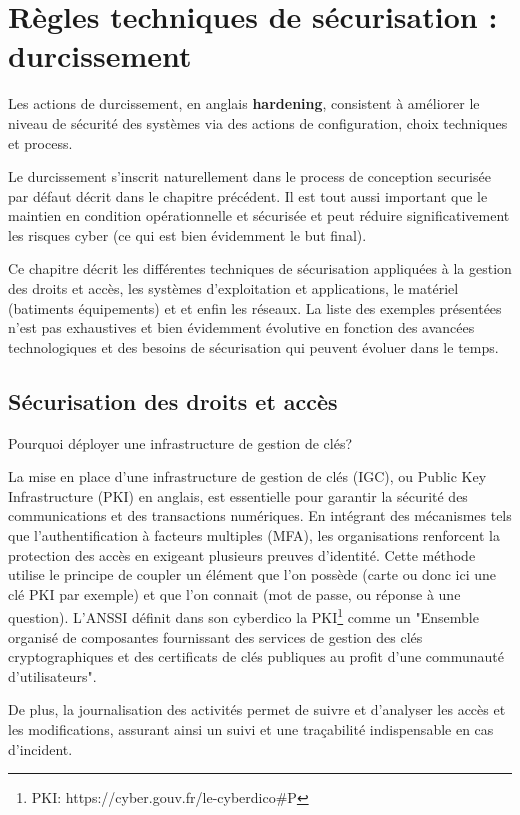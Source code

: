\section{Règles techniques de sécurisation : durcissement}

Les actions de durcissement, en anglais \textbf{hardening}, consistent à améliorer le niveau de sécurité des systèmes via des actions de configuration, choix techniques et process.

Le durcissement s'inscrit naturellement dans le process de conception securisée par défaut décrit dans le chapitre précédent. Il est tout aussi important que le maintien en condition opérationnelle et sécurisée et peut réduire significativement les risques cyber (ce qui est bien évidemment le but final).

Ce chapitre décrit les différentes techniques de sécurisation appliquées à la gestion des droits et accès, les systèmes d'exploitation et applications, le matériel (batiments équipements) et et enfin les réseaux.
La liste des exemples présentées n'est pas exhaustives et bien évidemment évolutive en fonction des avancées technologiques et des besoins de sécurisation qui peuvent évoluer dans le temps.

\subsection{Sécurisation des droits et accès} 

Pourquoi déployer une infrastructure de gestion de clés?

La mise en place d'une infrastructure de gestion de clés (IGC), ou Public Key Infrastructure (PKI) en anglais, est essentielle pour garantir la sécurité des communications et des transactions numériques. En intégrant des mécanismes tels que l'authentification à facteurs multiples (MFA), les organisations renforcent la protection des accès en exigeant plusieurs preuves d'identité. Cette méthode utilise le principe de coupler un élément que l'on possède (carte ou donc ici une clé PKI par exemple) et que l'on connait (mot de passe, ou réponse à une question).
L'ANSSI définit dans son cyberdico la PKI\footnote{PKI: https://cyber.gouv.fr/le-cyberdico#P} comme un "Ensemble organisé de composantes fournissant des services de gestion des clés cryptographiques et des certificats de clés publiques au profit d’une communauté d’utilisateurs". 

De plus, la journalisation des activités permet de suivre et d'analyser les accès et les modifications, assurant ainsi un suivi et une traçabilité indispensable en cas d'incident. 

